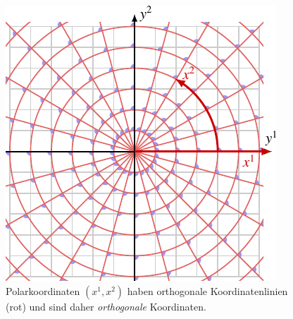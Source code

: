 %
%
%
\begin{figure}
\centering
\includegraphics{papers/diffortho/images/polar.pdf}
\caption{Polarkoordinaten $(x^1,x^2)$ haben orthogonale Koordinatenlinien
({\color{darkred}rot})
und sind daher {\em orthogonale} Koordinaten.
\label{diffortho:fig:polar}}
\end{figure}
